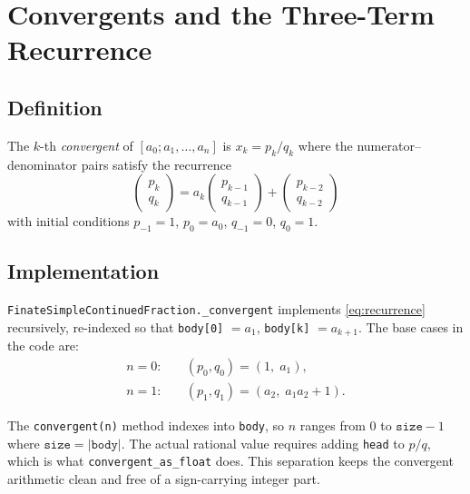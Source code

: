\section{Convergents and the Three-Term Recurrence}

\subsection{Definition}

\begin{definition}[Convergent]
  The $k$-th \emph{convergent} of $[a_0; a_1, \ldots, a_n]$ is
  $x_k = p_k / q_k$ where the numerator--denominator pairs satisfy the recurrence
  \begin{equation}\label{eq:recurrence}
    \begin{pmatrix} p_k \\ q_k \end{pmatrix}
    = a_k \begin{pmatrix} p_{k-1} \\ q_{k-1} \end{pmatrix}
    + \begin{pmatrix} p_{k-2} \\ q_{k-2} \end{pmatrix}
  \end{equation}
  with initial conditions $p_{-1} = 1$, $p_0 = a_0$, $q_{-1} = 0$, $q_0 = 1$.
\end{definition}

\subsection{Implementation}

\texttt{FinateSimpleContinuedFraction.\_convergent} implements \cref{eq:recurrence}
recursively, re-indexed so that \texttt{body[0]} $= a_1$, \texttt{body[k]} $= a_{k+1}$.
The base cases in the code are:
\begin{align*}
  n=0: &\quad (p_0, q_0) = (1,\; a_1),  \\
  n=1: &\quad (p_1, q_1) = (a_2,\; a_1 a_2 + 1).
\end{align*}

\begin{remark}
The \texttt{convergent(n)} method indexes into \texttt{body}, so $n$ ranges from $0$ to
$\texttt{size}-1$ where $\texttt{size} = |\texttt{body}|$.
The actual rational value requires adding \texttt{head} to $p/q$, which is what
\texttt{convergent\_as\_float} does.
This separation keeps the convergent arithmetic clean and free of a sign-carrying integer part.
\end{remark}

